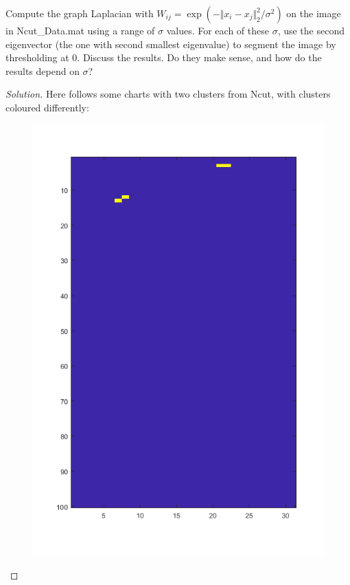 \documentclass[10pt]{article}
\newenvironment{problem}[2][]{\begin{trivlist}
\item[\hskip \labelsep {\bfseries #1}\hskip \labelsep {\bfseries #2.}]}{\end{trivlist}}
\begin{document}
\begin{problem}{Question 3}

Compute the graph Laplacian with $W_{ij} = \exp(-\Vert x_i - x_j \Vert_2^2/ \sigma^2)$ on the image in Ncut\_Data.mat using a range of $\sigma$ values. For each of these $\sigma$, use the second eigenvector (the one with second smallest eigenvalue) to segment the image by thresholding at $0$. Discuss the results. Do they make sense, and how do the results depend on $\sigma$?

\end{problem}

\begin{proof}[Solution]

Here follows some charts with two clusters from Ncut, with clusters coloured differently:

\begin{figure}[H]
\centering
\begin{minipage}{.5\textwidth}
  \centering
  \includegraphics[width=\linewidth]{pepper_sigma_001}

\end{minipage}
\end{figure}
\end{proof}
\end{document}

